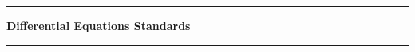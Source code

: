 \documentclass[letterpaper]{article}
\newcommand{\module}{?}
\newcommand{\setModule}[1]{\renewcommand{\module}{#1}}
\begin{document}
\pagestyle{empty}
\vspace{0.3in}
\hrule
\begin{center}\large \textbf{Differential Equations Standards}\end{center}
\hrule
\vspace{0.1in}

\setModule{C}

\setModule{F}

\setModule{S}

\setModule{N}

\setModule{D}

\end{document}
